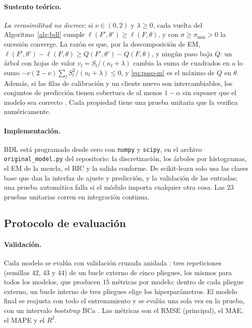 \paragraph{Sustento teórico.}
\emph{La verosimilitud no decrece}: si $\nu \in (0, 2)$ y $\lambda \ge 0$, cada vuelta del Algoritmo~\ref{alg:bdl}
cumple $\ell(F', \theta') \ge \ell(F, \theta)$, y con $\sigma \ge \sigma_{\min} > 0$ la sucesión converge. La razón es
que, por la descomposición de EM, $\ell(F', \theta') - \ell(F, \theta) \ge Q(F', \theta') - Q(F, \theta)$, y ningún paso
baja $Q$: un árbol con hojas de valor $v_l = S_l/(n_l + \lambda)$ cambia la suma de cuadrados en a lo sumo
$-\nu(2 - \nu)\sum_l S_l^2/(n_l + \lambda) \le 0$, y \eqref{eq:paso-m} es el máximo de $Q$ en $\theta$. Además, si las
filas de calibración y un cliente nuevo son intercambiables, los conjuntos de predicción tienen cobertura de al menos
$1 - \alpha$ sin suponer que el modelo sea correcto \citep{vovk2005}. Cada propiedad tiene una prueba unitaria que la
verifica numéricamente.

\paragraph{Implementación.}
\begin{sloppypar}
BDL está programado desde cero con \texttt{numpy} y \texttt{scipy}, en el archivo \texttt{original\_\allowbreak model.py}
del repositorio: la discretización, los árboles por histogramas, el EM de la mezcla, el BIC y la salida conforme. De
scikit-learn solo usa las clases base que dan la interfaz de ajuste y predicción, y la validación de las entradas; una
prueba automática falla si el módulo importa cualquier otra cosa. Las $23$ pruebas unitarias corren en integración continua.
\end{sloppypar}

\subsection{Protocolo de evaluación}\label{sec:protocolo}

\paragraph{Validación.}
Cada modelo se evalúa con validación cruzada anidada \citep{cawley2010}: tres repeticiones (semillas $42$, $43$ y $44$)
de un bucle externo de cinco pliegues, los mismos para todos los modelos, que producen $15$ métricas por modelo; dentro
de cada pliegue externo, un bucle interno de tres pliegues elige los hiperparámetros. El modelo final se reajusta con
todo el entrenamiento y se evalúa una sola vez en la prueba, con un intervalo \emph{bootstrap} BCa \citep{efron1987}.
Las métricas son el RMSE (principal), el MAE, el MAPE y el $R^2$.

